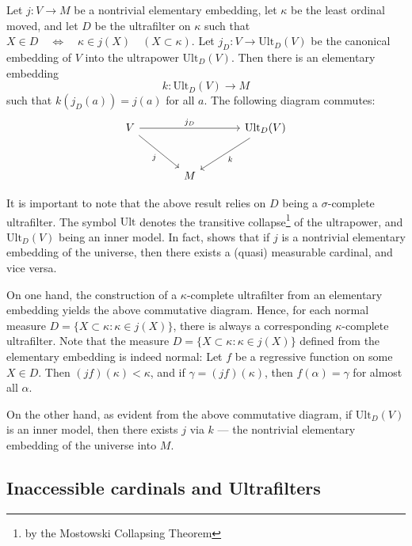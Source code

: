 \begin{lemma}\label{lemma_nontriv_elem_embedding}
    Let \(j : V \to M\) be a nontrivial elementary embedding, let \(\kappa\) be 
    the least ordinal moved, and let \(D\) be the ultrafilter on \(\kappa\) 
    such that $ X \in D \quad \Longleftrightarrow \quad \kappa \in j(X) \quad (X \subset \kappa)$.
    Let $j_D : V \to \mathrm{Ult}_D(V)$ be the canonical embedding of \(V\) into the ultrapower \(\mathrm{Ult}_D(V)\). 
    Then there is an elementary embedding 
    \[
      k : \mathrm{Ult}_D(V) \to M
    \]
    such that \(k(j_D(a)) = j(a)\) for all \(a\). The following diagram commutes:
    \[
    \begin{tikzcd}[row sep=large, column sep=large]
    V \arrow[rr, "j_D"] \arrow[dr, "j"'] 
        & 
        & \mathrm{Ult}_D(V) \arrow[dl, "k"] \\
        & M &
    \end{tikzcd}
    \]
\end{lemma}

It is important to note that the above result relies on $D$ being a $\sigma$-complete ultrafilter. The symbol $\mathrm{Ult}$ denotes the transitive collapse\footnote{by the Mostowski Collapsing Theorem} of the ultrapower, and $\mathrm{Ult}_D(V)$ being an inner model. In fact, \cite{jech2003set} shows that if $j$ is a nontrivial elementary embedding of the universe, then there exists a (quasi) measurable cardinal, and vice versa. 

On one hand, the construction of a $\kappa$-complete ultrafilter from an elementary embedding yields the above commutative diagram. Hence, for each normal measure $D = \{X \subset \kappa : \kappa \in j(X)\}$, there is always a corresponding $\kappa$-complete ultrafilter. Note that the measure $D = \{X \subset \kappa : \kappa \in j(X)\}$ defined from the elementary embedding is indeed normal: Let $f$ be a regressive function on some $X \in D$. Then $(jf)(\kappa) < \kappa$, and if $\gamma = (jf)(\kappa)$, then $f(\alpha) = \gamma$ for almost all $\alpha$.

On the other hand, as evident from the above commutative diagram, if $\mathrm{Ult}_D(V)$ is an inner model, then there exists $j$ via $k$ — the nontrivial elementary embedding of the universe into $M$.

\subsection{Inaccessible cardinals and Ultrafilters}

